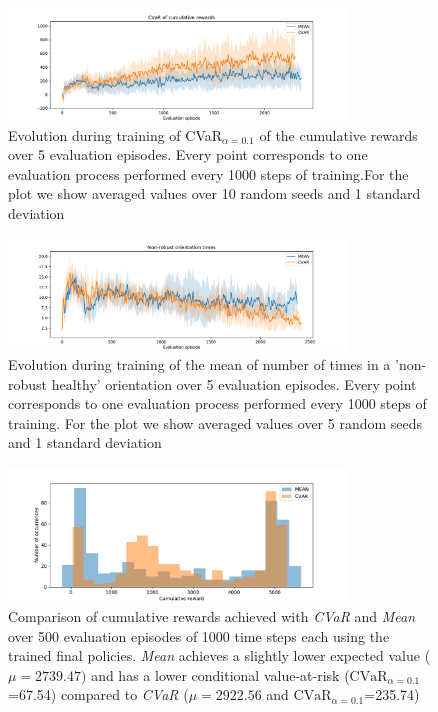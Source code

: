 \begin{figure}[ht]
    \centering
    \includegraphics[width=0.8\textwidth]{images/Walker_offpolicy_expert/cvar_train_withstds.pdf}
    \caption{Evolution during training of CVaR$_{\alpha=0.1}$ of the cumulative rewards over 5 evaluation episodes.
    Every point corresponds to one evaluation process performed every 1000 steps of training.For the plot we
    show averaged values over 10 random seeds and 1 standard deviation}
    \label{fig:cvar_walker}

\end{figure}



\begin{figure}[ht]
    \centering
    \includegraphics[width=0.8\textwidth]{images/Walker_offpolicy_expert/times_exceedvel_withstds.pdf}
    \caption{Evolution during training of the mean of number of times in a 'non-robust healthy'
    orientation over  5 evaluation episodes.
    Every point corresponds to one evaluation process performed every 1000 steps of training.
    For the plot we show averaged values over 5 random seeds and 1 standard deviation
    }
    \label{fig:vel_exceed_walker}

\end{figure}

\begin{figure}[ht]
\centering
\includegraphics[width=0.8\textwidth]{images/Walker_offpolicy_expert/hist_evaluation_numevalsteps1000.pdf}
\caption{Comparison of cumulative rewards achieved with \textit{CVaR} and \textit{Mean}
over 500 evaluation episodes of 1000 time steps each using the trained final policies.
\textit{Mean} achieves a slightly lower expected value ($\mu=2739.47)$ and 
has a lower conditional value-at-risk ($\text{CVaR}_{\alpha= 0.1}$=67.54) compared to
\textit{CVaR} ($\mu=2922.56$ and $\text{CVaR}_{\alpha= 0.1}$=235.74)}
\label{fig:hist_cum_rewards_walker}
\end{figure}

